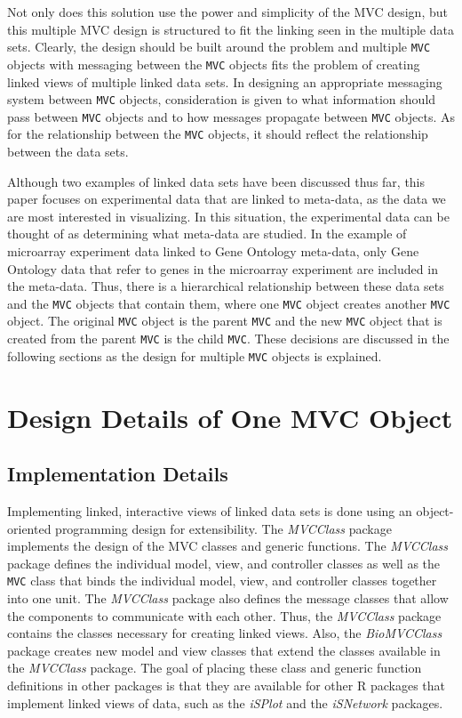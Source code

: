 \documentclass{article}[11pt]
\newcommand{\Robject}[1]{{\texttt{#1}}}
\newcommand{\Rpackage}[1]{{\textit{#1}}}
\newcommand{\Rclass}[1]{\texttt{#1}}
\begin{document}
Not only does this solution use the power and simplicity of the MVC design, but
this multiple MVC design is structured to fit the linking seen in the multiple
data sets.  Clearly, the design should be built around the problem and
multiple \Robject{MVC} objects with messaging between the \Robject{MVC}
objects fits the problem of creating linked views of multiple linked data
sets.  In designing an appropriate messaging system between \Robject{MVC}
objects, consideration is given to what information should pass between
\Robject{MVC} objects and to how messages propagate between \Robject{MVC}
objects.  As for the relationship between the \Robject{MVC} objects, it should
reflect the relationship between the data sets. 

Although two examples of linked data sets have been discussed thus far,
this paper focuses on experimental data that are linked to meta-data, as
the data we are most interested in visualizing.  In this situation, the
experimental data can be thought of as determining what meta-data are studied.
In the example of microarray experiment data linked to Gene Ontology
meta-data, only Gene Ontology data that refer to genes in the microarray
experiment are included in the meta-data.  Thus, there is a hierarchical
relationship between these data sets and the \Robject{MVC} objects that
contain them, where one \Robject{MVC} object creates another \Robject{MVC}
object.  The original \Robject{MVC} object is the parent \Robject{MVC} and the
new \Robject{MVC} object that is created from the parent \Robject{MVC} is the
child \Robject{MVC}.  These decisions are discussed in the following sections
as the design for multiple \Robject{MVC} objects is explained. 

\section{Design Details of One MVC Object}
\label{Sec:OneMVC}

\subsection{Implementation Details}
\label{SSec:OneOver}

Implementing linked, interactive views of linked data sets is done using an
object-oriented programming design for extensibility.  The \Rpackage{MVCClass}
package implements the design of the MVC classes and generic functions.  The
\Rpackage{MVCClass} package defines the individual model, view, and controller
classes as well as the \Rclass{MVC} class that binds the individual model,
view, and controller classes together into one unit.  The \Rpackage{MVCClass}
package also defines the message classes that allow the components to
communicate with each other.  Thus, the \Rpackage{MVCClass} package contains
the classes necessary for creating linked views.  Also, the
\Rpackage{BioMVCClass} package creates new model and view classes that extend
the classes available in the \Rpackage{MVCClass} package.  The goal of placing
these class and generic function definitions in other packages is that they are
available for other \textsf{R} packages that implement linked views of data,
such as the \Rpackage{iSPlot} and the \Rpackage{iSNetwork} packages.  
\end{document}
